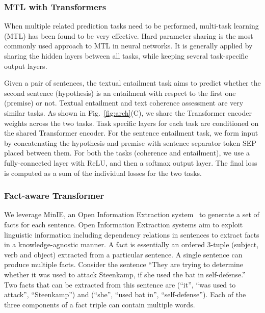 \documentclass[11pt]{article}
\begin{document}
\subsubsection{MTL with Transformers}
When multiple related prediction tasks need to be performed, multi-task learning (MTL) has been found to be very effective. Hard parameter sharing is the most commonly used approach to MTL in neural networks. It is generally applied by sharing the hidden layers between all tasks, while keeping several task-specific output layers. 

Given a pair of sentences, the textual entailment task aims to predict whether the second sentence (hypothesis) is an entailment with respect to the first one (premise) or not. Textual entailment and text coherence assessment are very similar tasks. As shown in Fig.~\ref{fig:arch}(C), we share the Transformer encoder weights across the two tasks. Task specific layers for each task are conditioned on the shared Transformer encoder. For the sentence entailment task, we form input by concatenating the hypothesis and premise with sentence separator token SEP placed between them. For both the tasks (coherence and entailment), we use a fully-connected layer with ReLU, and then a softmax output layer. The final loss is computed as a sum of the individual losses for the two tasks. 

\subsubsection{Fact-aware Transformer}
We leverage MinIE, an Open Information Extraction system~\cite{gashteovski2017minie} to generate a set of facts for each sentence. Open Information Extraction systems aim to exploit linguistic information including dependency relations in sentences to extract facts in a knowledge-agnostic manner. A fact is essentially an ordered 3-tuple (subject, verb and object)  extracted from a particular sentence. A single sentence can produce multiple facts. Consider the sentence ``They are trying to determine whether it was used to attack Steenkamp, if she used the bat in self-defense.'' Two facts that can be extracted from this sentence are  (``it'', ``was used to attack'', ``Steenkamp'') and  (``she'', ``used bat in'', ``self-defense''). Each of the three components of a fact triple can contain multiple words. 
\end{document}
